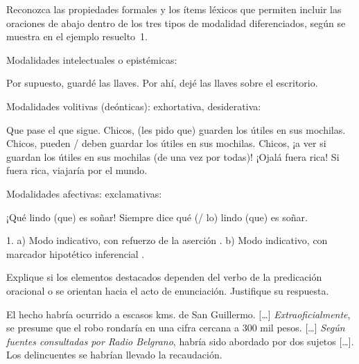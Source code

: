 \begin{ejercicio}\label{ej:14-tipos}
Reconozca las propiedades formales y los ítems léxicos que permiten incluir las
oraciones de abajo dentro de los tres tipos de modalidad diferenciados, según se
muestra en el ejemplo resuelto~1.

\begin{exe}
  \ex Modalidades intelectuales o epistémicas:
    \begin{xlist}
      \ex Por supuesto, guardé las llaves.
      \ex Por ahí, dejé las llaves sobre el escritorio.
    \end{xlist}
  \ex Modalidades volitivas (deónticas): exhortativa, desiderativa:
    \begin{xlist}
      \ex Que pase el que sigue.
      \ex Chicos, (les pido que) guarden los útiles en sus mochilas.
      \ex Chicos, pueden / deben guardar los útiles en sus mochilas.
      \ex Chicos, ¡a ver si guardan los útiles en sus mochilas (de una vez por
          todas)!
      \ex ¡Ojalá fuera rica! Si fuera rica, viajaría por el mundo.
    \end{xlist}
  \ex Modalidades afectivas: exclamativas:
    \begin{xlist}
      \ex ¡Qué lindo (que) es soñar!
      \ex Siempre dice qué (/ lo) lindo (que) es soñar.
    \end{xlist}
\end{exe}

\begin{resuelto}
1. a) Modo indicativo, con refuerzo de la aserción . b) Modo
indicativo, con marcador hipotético inferencial .
\end{resuelto}
\end{ejercicio}

\begin{ejercicio}\label{ej:14-periferia}
Explique si los elementos destacados dependen del verbo de la predicación
oracional o se orientan hacia el acto de enunciación. Justifique su respuesta.

\begin{textolectura}
El hecho habría ocurrido a escasos kms. de San Guillermo. [\ldots]
\textit{Extraoficialmente}, se presume que el robo rondaría en una cifra cercana
a 300 mil pesos. [\ldots] \textit{Según fuentes consultadas por Radio Belgrano},
habría sido abordado por dos sujetos [\ldots]. Los delincuentes se habrían
llevado la recaudación.
\end{textolectura}
\end{ejercicio}

